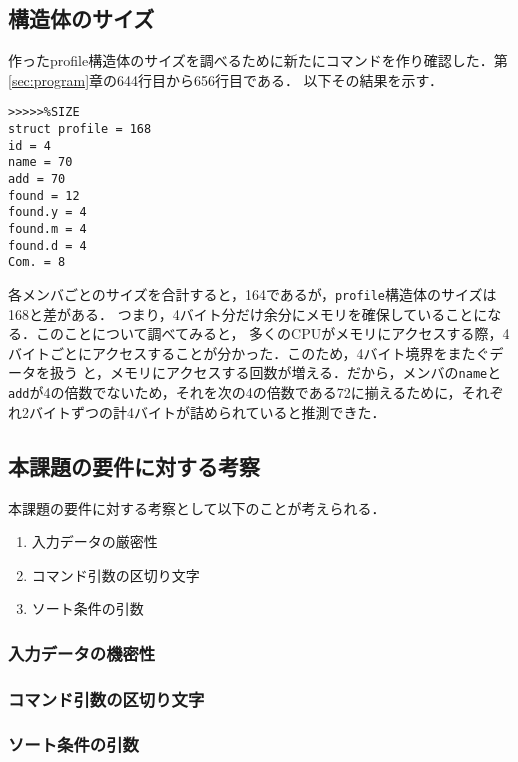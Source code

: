 \documentclass[a4j,11pt]{jarticle}
\begin{document}
\subsection{構造体のサイズ}
作ったprofile構造体のサイズを調べるために新たにコマンドを作り確認した．第\ref{sec:program}章の644行目から656行目である．
以下その結果を示す．
\begin{verbatim}
>>>>>%SIZE
struct profile = 168
id = 4
name = 70
add = 70
found = 12
found.y = 4
found.m = 4
found.d = 4
Com. = 8
\end{verbatim}
各メンバごとのサイズを合計すると，164であるが，\verb|profile|構造体のサイズは168と差がある．
つまり，4バイト分だけ余分にメモリを確保していることになる．このことについて調べてみると，
多くのCPUがメモリにアクセスする際，4バイトごとにアクセスすることが分かった．このため，4バイト境界をまたぐデータを扱う
と，メモリにアクセスする回数が増える．だから，メンバの\verb|name|と\verb|add|が4の倍数でないため，それを次の4の倍数である72に揃えるために，それぞれ2バイトずつの計4バイトが詰められていると推測できた．
\subsection{本課題の要件に対する考察}
本課題の要件に対する考察として以下のことが考えられる．
\begin{enumerate}
\setlength{\parskip}{2pt} \setlength{\itemsep}{2pt}
 \item 入力データの厳密性
 \item コマンド引数の区切り文字
 \item ソート条件の引数
\end{enumerate}
\subsubsection{入力データの機密性}
\subsubsection{コマンド引数の区切り文字}
\subsubsection{ソート条件の引数}
\end{document}
